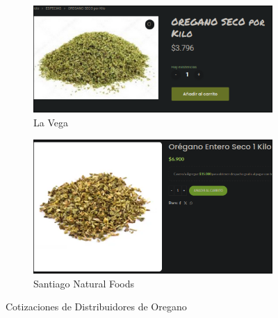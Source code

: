 \documentclass[12pt]{article}
\begin{document}
        \begin{figure}[H] %
            \centering
            \begin{subfigure}{0.5\textwidth}
                \centering
                \includegraphics[width=0.9\linewidth]{vega} %
                \caption{La Vega}
                \label{fig:la_vega_oregano}
            \end{subfigure}
            \hfill
            \begin{subfigure}{0.4\textwidth}
                \centering
                \includegraphics[width=0.9\linewidth]{Oregano} %
                \caption{Santiago Natural Foods}
                \label{fig:santiago_natural_foods_oregano}
            \end{subfigure}
            \caption{Cotizaciones de Distribuidores de Oregano}
            \label{fig:cotizaciones_oregano}
        \end{figure} %
\end{document}
